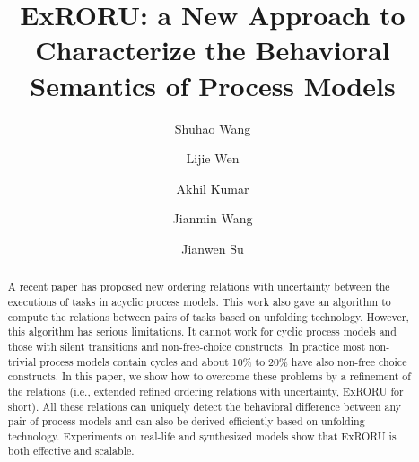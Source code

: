 \documentclass{llncs}
\begin{document}
\frontmatter 
\pagestyle{headings}

\mainmatter
\title{ExRORU: a New Approach to Characterize the Behavioral Semantics of Process Models}

\author[$1$]{Shuhao Wang}
\author[$1$]{Lijie Wen}
\author[$2$]{Akhil Kumar}
\author[$1$]{Jianmin Wang}
\author[$3$]{Jianwen Su}
\institute{}

\maketitle

\begin{abstract}
A recent paper has proposed new ordering relations with uncertainty between the executions of tasks in acyclic process models. This work also gave an algorithm to compute the relations between pairs of tasks based on unfolding technology. However, this algorithm has serious limitations. It cannot work for cyclic process models and those with silent transitions and non-free-choice constructs. In practice most non-trivial process models contain cycles and about 10\% to 20\% have also non-free choice constructs. In this paper, we show how to overcome these problems by a refinement of the relations (i.e., extended refined ordering relations with uncertainty, ExRORU for short). All these relations can uniquely detect the behavioral difference between any pair of process models and can also be derived efficiently based on unfolding technology. Experiments on real-life and synthesized models show that ExRORU is both effective and scalable.
\end{abstract}
\end{document}
